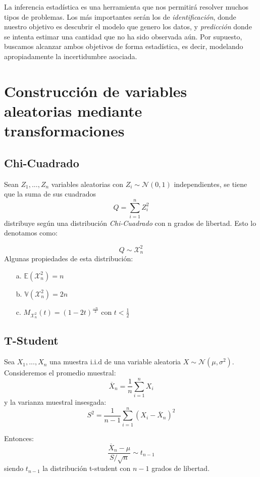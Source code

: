 La inferencia estadística es una herramienta que nos permitirá resolver muchos tipos de problemas. Los más importantes serán los de \emph{identificación}, donde nuestro objetivo es descubrir el modelo que genero los datos, y \emph{predicción} donde se intenta estimar una cantidad que no ha sido observada aún. Por supuesto, buscamos alcanzar ambos objetivos de forma estadística, es decir,  modelando apropiadamente la incertidumbre asociada.



\section{Construcción de variables aleatorias mediante transformaciones}

\subsection{Chi-Cuadrado}

Sean $Z_1,..., Z_n$ variables aleatorias con $Z_i\sim\mathcal{N}(0,1)$ independientes, se tiene que la suma de sus cuadrados 
\[Q=\sum\limits_{i=1}^{n} Z_i^2\]
distribuye según una distribución \textit{Chi-Cuadrado} con n grados de libertad. Esto lo denotamos como:

\[Q\sim\mathcal{X}^2_n \]
Algunas propiedades de esta distribución:
\begin{enumerate}
    \item [a.] $\mathbb{E}(\mathcal{X}^2_n) = n$
    \item [b.] $\mathbb{V}(\mathcal{X}^2_n) = 2n$
    \item [c.] $M_{\mathcal{X}^2_n}(t) = (1-2t)^{\frac{-n}{2}}$ con $t<\frac{1}{2}$
    
\end{enumerate}

\subsection{T-Student}

Sea $X_1,...,X_n$ una muestra i.i.d de una variable aleatoria $X\sim\mathcal{N}(\mu,\sigma^2)$. Consideremos el promedio muestral:
\[\overline{X}_n=\dfrac{1}{n}\sum\limits_{i=1}^n X_i\]
y la varianza muestral insesgada:
\[S^2=\dfrac{1}{n-1}\sum\limits_{i=1}^n (X_i-\overline{X}_n)^2\]

Entonces:
\[\dfrac{\overline{X}_n-\mu}{S/\sqrt{n}}\sim t_{n-1}\]
siendo $t_{n-1}$ la distribución t-student con $n-1$ grados de libertad.
